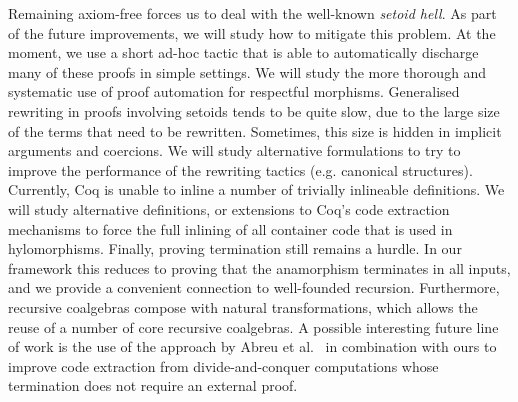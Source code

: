 \documentclass[ a4paper, UKenglish, cleveref, autoref, thm-restate]{lipics-v2021}
\begin{document}
Remaining axiom-free forces us to deal with the well-known
\emph{setoid hell}. As part of the future improvements, we will study how to
mitigate this problem. At the moment, we use a short ad-hoc tactic that is able
to automatically discharge many of these proofs in simple settings.  We will
study the more thorough and systematic use of proof automation for respectful
morphisms.  Generalised rewriting in proofs involving setoids tends to be quite
slow, due to the large size of the terms that need to be rewritten. Sometimes,
this size is hidden in implicit arguments and coercions. We will study
alternative formulations to try to improve the performance of the rewriting
tactics (e.g.  canonical structures).  Currently, Coq is unable to inline a
number of trivially inlineable definitions.  We will study alternative
definitions, or extensions to Coq's code extraction mechanisms to force the
full inlining of all container code that is used in hylomorphisms.  Finally,
proving termination still remains a hurdle. In our framework this reduces to
proving that the anamorphism
terminates in all inputs, and we provide a convenient connection to
well-founded recursion. Furthermore, recursive coalgebras compose with natural
transformations, which allows the reuse
of a number of core recursive coalgebras. A possible interesting future line of work
is the use of the approach by Abreu et al.~\cite{AbreuDHJMS23} in combination with ours to
improve code extraction from divide-and-conquer computations whose termination
does not require an external proof. 




\end{document}
